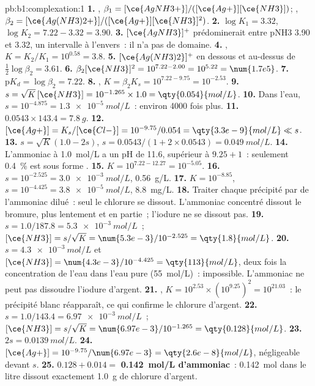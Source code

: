 \begin{solution}{pb:b1:complexation:1}
\textbf{1.} , $\beta_1 = [\ce{AgNH3+}]/([\ce{Ag+}][\ce{NH3}])$;
, $\beta_2 = [\ce{Ag(NH3)2+}]/([\ce{Ag+}][\ce{NH3}]^2)$.
\textbf{2.} $\log K_1 = 3.32$, $\log K_2 = 7.22 - 3.32 = 3.90$.
\textbf{3.} $[\ce{AgNH3}]^{+}$ prédominerait entre pNH3 3.90 et 3.32,
un intervalle à l'envers~: il n'a pas de domaine.
\textbf{4.} , $K = K_2/K_1 = 10^{0.58} =
3.8$.
\textbf{5.} $[\ce{Ag(NH3)2}]^{+}$ en dessous et  au-dessus de
$\frac12\log\beta_2 = 3.61$.
\textbf{6.} $\beta_2[\ce{NH3}]^2 = 10^{7.22 - 2.00} = 10^{5.22} = \num{1.7e5}$.
\textbf{7.} $\mathrm{p}K_d = \log\beta_2 = 7.22$.
\textbf{8.} , $K = \beta_2K_s =
10^{7.22 - 9.75} = 10^{-2.53}$.
\textbf{9.} $s = \sqrt{K}\,[\ce{NH3}] = 10^{-1.265} \times 1.0 =
\qty{0.054}{mol/L}$.
\textbf{10.} Dans l'eau, $s = 10^{-4.875} = \qty{1.3e-5}{mol/L}$~:
environ 4000 fois plus.
\textbf{11.} $0.0543 \times 143.4 = \qty{7.8}{g}$.
\textbf{12.} $[\ce{Ag+}] = K_s/[\ce{Cl-}] = 10^{-9.75}/0.054 =
\qty{3.3e-9}{mol/L} \ll s$.
\textbf{13.} $s = \sqrt{K}(1.0 - 2s)$, $s = 0.0543/(1 + 2 \times 0.0543) =
\qty{0.049}{mol/L}$.
\textbf{14.} L'ammoniac à \qty{1.0}{mol/L} a un pH de 11.6, supérieur à
$9.25 + 1$~: seulement \qty{0.4}{\percent} est sous forme .
\textbf{15.} $K = 10^{7.22 - 12.27} = 10^{-5.05}$.
\textbf{16.} $s = 10^{-2.525} = \qty{3.0e-3}{mol/L}$, \qty{0.56}{g/L}.
\textbf{17.} $K = 10^{-8.85}$, $s = 10^{-4.425} = \qty{3.8e-5}{mol/L}$,
\qty{8.8}{mg/L}.
\textbf{18.} Traiter chaque précipité par de l'ammoniac dilué~: seul le
chlorure se dissout. L'ammoniac concentré dissout le bromure, plus
lentement et en partie~; l'iodure ne se dissout pas.
\textbf{19.} $s = 1.0/187.8 = \qty{5.3e-3}{mol/L}$~; $[\ce{NH3}] = s/\sqrt{K}
= \num{5.3e-3}/10^{-2.525} = \qty{1.8}{mol/L}$.
\textbf{20.} $s = \qty{4.3e-3}{mol/L}$ et $[\ce{NH3}] = \num{4.3e-3}/10^{-4.425}
= \qty{113}{mol/L}$, deux fois la concentration de l'eau dans l'eau pure
(\qty{55}{mol/L})~: impossible. L'ammoniac ne peut pas dissoudre
l'iodure d'argent.
\textbf{21.} ,
$K = 10^{2.53} \times (10^{9.25})^2 = 10^{21.03}$~: le précipité blanc
réapparaît, ce qui confirme le chlorure d'argent.
\textbf{22.} $s = 1.0/143.4 = \qty{6.97e-3}{mol/L}$~; $[\ce{NH3}] =
s/\sqrt{K} = \num{6.97e-3}/10^{-1.265} = \qty{0.128}{mol/L}$.
\textbf{23.} $2s = \qty{0.0139}{mol/L}$.
\textbf{24.} $[\ce{Ag+}] = 10^{-9.75}/\num{6.97e-3} = \qty{2.6e-8}{mol/L}$,
négligeable devant $s$.
\textbf{25.} $0.128 + 0.014 = $ \textbf{\qty{0.142}{mol/L} d'ammoniac}~:
\qty{0.142}{mol} dans le litre dissout exactement \qty{1.0}{g} de
chlorure d'argent.
\end{solution}
